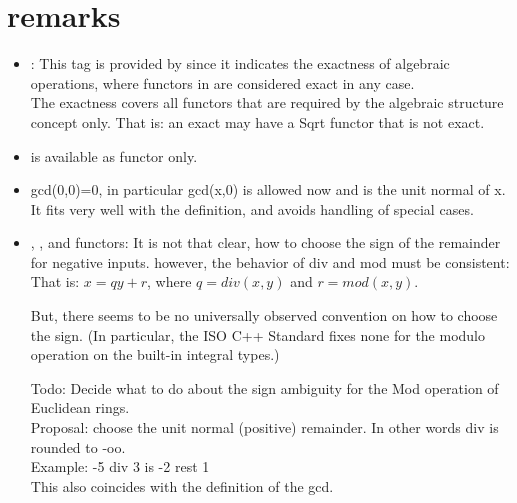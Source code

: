 \section{remarks}
\begin{itemize}
\item {}: 
This tag is provided by  since it indicates the 
exactness of algebraic operations, where functors in 
are considered exact in any case. \\
The exactness covers all functors that are required by the 
algebraic structure concept only. 
That is: an exact  may have a Sqrt functor that is not exact. \\

\item {} is available as functor only.\\

\item gcd(0,0)=0, in particular gcd(x,0) is allowed now and is the unit normal of x. 
      It fits very well with the definition, 
       and avoids handling of special cases. \\

\item {}, ,  and functors:
        It is not that clear, how to choose the sign of the remainder for negative inputs. 
        however, the behavior of div and mod must be consistent: \\
        That is: $ x = qy + r $, where $q= div(x,y)$ and $r = mod(x,y)$.
        
        But, there seems to be no universally observed convention on how to choose 
        the sign. (In particular, the ISO C++ Standard fixes none for the modulo operation 
        on the built-in integral types.)

        Todo: Decide what to do about the sign ambiguity for the Mod operation of Euclidean rings.\\
        Proposal: choose the unit normal (positive) remainder. In other words div is rounded to -oo.\\
        Example: -5 div 3 is -2 rest 1 \\
        This also coincides with the definition of the gcd. 


\end{itemize}
